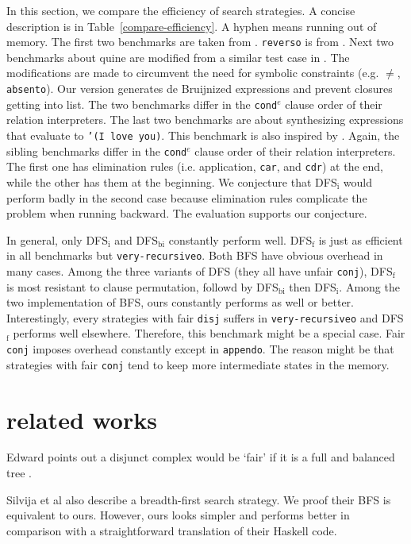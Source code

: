 \documentclass[format=acmlarge, review=true, authordraft=true]{acmart}
\newcommand{\conde}{\texttt{cond$^e$} }
\newcommand{\conj}{\texttt{conj}}
\newcommand{\disj}{\texttt{disj}}
\begin{document}
In this section, we compare the efficiency of search strategies. A concise 
description is in Table~\ref{compare-efficiency}. A hyphen means running out of 
memory. The first two benchmarks are taken from 
\citep{friedman_reasoned_2018}. \texttt{reverso} is from 
\citep{rozplokhas2018improving}. Next two benchmarks 
about quine are modified from a similar test case in \citep{byrd2017unified}. 
The modifications are made 
to circumvent the need for symbolic constraints (e.g. $\neq$, 
\texttt{absento}). Our version generates de 
Bruijnized expressions and prevent closures getting into list. The two 
benchmarks differ in the \conde clause order of their relation interpreters. 
The last two 
benchmarks are about synthesizing expressions that evaluate to \texttt{'(I love 
you)}. This benchmark is also inspired by \citep{byrd2017unified}. Again, the 
sibling benchmarks differ in the \conde clause order of their relation 
interpreters. The first one 
has elimination rules (i.e. application, \texttt{car}, and \texttt{cdr}) at the 
end, while the other has them at the beginning. We conjecture that DFS$_\textrm{i}$ would 
perform badly in the second case because elimination rules complicate the 
problem when running backward. The evaluation supports our conjecture.

In general, only DFS$_\textrm{i}$ and DFS$_\textrm{bi}$ constantly perform well. DFS$_\textrm{f}$ is just as 
efficient in all benchmarks but \texttt{very-recursiveo}. Both BFS have obvious 
overhead in many cases. Among the three variants of DFS (they all have unfair 
\conj{}), DFS$_\textrm{f}$ is most resistant to clause permutation, followd by DFS$_\textrm{bi}$ then 
DFS$_\textrm{i}$. Among the two implementation of BFS, ours constantly performs as well or 
better. Interestingly, every strategies with fair \disj{} suffers in 
\texttt{very-recursiveo} and DFS$_\textrm{f}$ performs well elsewhere. Therefore, this 
benchmark might be a special case. Fair \conj{} imposes overhead constantly 
except in \texttt{appendo}. The reason might be that strategies with fair 
\conj{} tend to keep more intermediate states in the memory.

\section{related works}

Edward points out a disjunct complex would be `fair' if it is a full and 
balanced tree \citep{yang2010adventures}.

Silvija et al \citep{seres1999algebra} also describe a breadth-first search 
strategy. We proof their BFS is equivalent to ours. However, ours looks simpler 
and performs better in comparison with a straightforward translation of their 
Haskell code.
\end{document}
